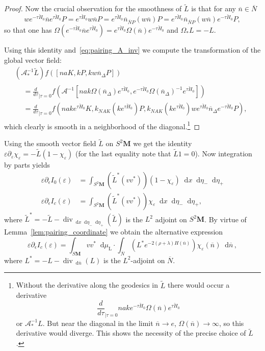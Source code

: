 \documentclass[AHL, Unicode, longabstracts, published]{cedram}
\DeclareMathOperator{\Div}{div}
\newcommand{\rml}{\mathrm{L}}
\newcommand{\til}{\widetilde}
\newcommand{\intd}{\mathop{}\!\mathrm{d}}
\newcommand{\bn}{{\overline{n}}}
\newcommand{\bN}{{\overline{N}}}
\newcommand{\cH}{{\check{H}_0}}
\begin{document}
\begin{proof}
Now the crucial observation for the smoothness of $\til L$ is that for any $\bn\in\bN$
\[
we^{-\tau\cH}\bn e^{\tau\cH}P=e^{\tau\cH}w\bn P=e^{\tau\cH}\bn_{\bN P}(w\bn) P= e^{\tau\cH}\bn_{\bN P}(w\bn)e^{-\tau \cH} P,
\]
so that one has $\Omega(e^{-\tau\cH}\bn e^{\tau\cH})=e^{\tau\cH}\Omega(\bn) e^{-\tau\cH}$ and $\Omega_*L=-L$.

Using this identity and~\eqref{eq:pairing_A_inv} we compute the transformation of the global vector field:
\begin{multline}\label{eq:L_near_diag}
\left(\mathcal A^{-1}_*\til L\right) f([naK, kP, kw\bn_\Delta P])\\
\begin{aligned}
&=\frac{d}{d\tau}_{|\tau=0}f\left(\mathcal A^{-1}\left[nak\Omega(\bn_\Delta) e^{\tau\cH}, e^{-\tau\cH}\Omega(\bn_\Delta)^{-1} e^{\tau \cH}\right]\right)\\
&= \frac{d}{d\tau}_{|\tau=0} f\left(nake^{\tau\check H_0}K, k_{NAK}\left(ke^{\tau\cH}\right)P, k_{NAK}\left(ke^{\tau\cH}\right)we^{\tau\cH} \bn_\Delta e^{-\tau\cH}P\right),
\end{aligned}
\end{multline}
which clearly is smooth in a neighborhood of the diagonal.\footnote{Without the derivative along the geodesics in $\til L$ there would occur a derivative
\[
\frac{d}{d\tau}_{|\tau=0} nake^{-\tau\cH}\Omega(\bn) e^{\tau\cH}
\] 
or $\mathcal A^{-1}_*L$. But near the diagonal in the limit $\bn\to e$, $\Omega(\bn)\to\infty$, so this derivative would diverge. This shows the necessity of the precise choice of $\til L$.}
\end{proof}

Using the smooth vector field $\til L$ on $S^2\mathbf M$ we get the identity $\varepsilon\partial_\varepsilon \chi_\varepsilon = -\til L(1-\chi_\varepsilon)$ (for the last equality note that $\til L1=0$). Now integration by parts yields
\begin{equation}\label{eq:partical_int}
\begin{aligned}
\varepsilon\partial_\epsilon I_0(\varepsilon) &= \int_{S^2\mathbf M} \left(\til L^*(vv^*)\right)(1-\chi_\varepsilon)
\intd x\intd \eta_-\intd \eta_+ 
\\
\varepsilon\partial_\epsilon I_c(\varepsilon) &= \int_{S^2\mathbf M} \left(\til L^*(vv^*)\right)\chi_\varepsilon
\intd x\intd \eta_-\intd \eta_+,
\end{aligned}
\end{equation}
where $\til L^*=-\til{L}-\Div_{\intd x\intd\eta_-\intd\eta_+}(\til L)$ is the $L^2$ adjoint on $S^2\mathbf M$. By virtue of Lemma~\ref{lem:pairing_coordinate} we obtain the alternative expression 
\[
\varepsilon\partial_\epsilon I_c(\varepsilon) =
\int_{S\mathbf M} vv^*\intd\mu_{\rml} \cdot\int_{\bN} \left(L^* e^{-2(\rho+\lambda)H(\bn)}\right)
\chi_\varepsilon(\bn)\intd \bn\,,
\]
where $L^*=-L-\Div_{\intd\bn}(L)$ is the $L^2$-adjoint on $\bN$.
\end{document}
